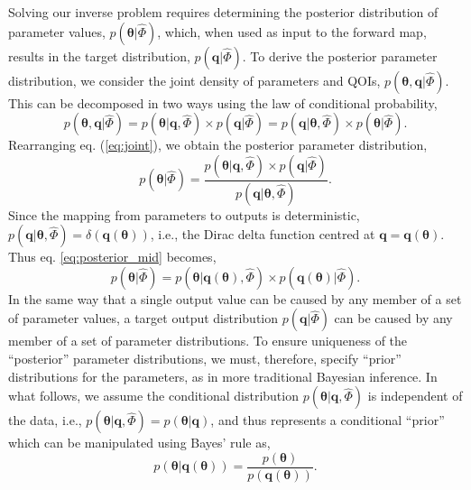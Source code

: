 Solving our inverse problem requires determining the posterior distribution of parameter values, $p(\boldsymbol{\theta}|\hat{\Phi})$, which, when used as input to the forward map, results in the target distribution, $p(\boldsymbol{q}|\hat{\Phi})$. To derive the posterior parameter distribution, we consider the joint density of parameters and QOIs, $p(\boldsymbol{\theta},\boldsymbol{q}|\hat{\Phi})$. This can be decomposed in two ways using the law of conditional probability,
%
\begin{equation}\label{eq:joint}
  p( \boldsymbol{\theta}, \boldsymbol{q}|\hat{\Phi})
= p( \boldsymbol{\theta}|\boldsymbol{q}, \hat{\Phi}) \times p(\boldsymbol{q}|\hat{\Phi})
= p( \boldsymbol{q}|\boldsymbol{\theta}, \hat{\Phi}) \times p(\boldsymbol{\theta}|\hat{\Phi}).
\end{equation}
%
Rearranging eq. (\ref{eq:joint}), we obtain the posterior parameter distribution,
%
\begin{equation}\label{eq:posterior_mid}
p(\boldsymbol{\theta}|\hat{\Phi})
= \frac{p(\boldsymbol{\theta}|\boldsymbol{q}, \hat{\Phi}) \times p(\boldsymbol{q}|\hat{\Phi})}{p(\boldsymbol{q}| \boldsymbol{\theta}, \hat{\Phi})}.
\end{equation}
%
Since the mapping from parameters to outputs is deterministic,
$p(\boldsymbol{q}| \boldsymbol{\theta}, \hat{\Phi})=\delta(\boldsymbol{q}(\boldsymbol{\theta}))$, i.e., the Dirac delta function centred at $\boldsymbol{q}=\boldsymbol{q}(\boldsymbol{\theta})$. Thus eq. \eqref{eq:posterior_mid} becomes,
%
\begin{equation}\label{eq:posterior_mid1}
p(\boldsymbol{\theta}|\hat{\Phi})
= p(\boldsymbol{\theta}|\boldsymbol{q}(\boldsymbol{\theta}), \hat{\Phi}) \times p(\boldsymbol{q}(\boldsymbol{\theta})|\hat{\Phi}).
\end{equation}
%
In the same way that a single output value can be caused by any member of a set of parameter values, a target output distribution $p(\boldsymbol{q}|\hat{\Phi})$ can be caused by any member of a set of parameter distributions. To ensure uniqueness of the ``posterior'' parameter distributions, we must, therefore, specify ``prior'' distributions for the parameters, as in more traditional Bayesian inference. In what follows, we assume the conditional distribution $p(\boldsymbol{\theta}|\boldsymbol{q}, \hat{\Phi})$ is independent of the data, i.e., $p(\boldsymbol{\theta}|\boldsymbol{q}, \hat{\Phi})=p(\boldsymbol{\theta}|\boldsymbol{q})$, and thus represents a conditional ``prior'' which can be manipulated using Bayes' rule as,
%
\begin{equation}\label{eq:prior}
p(\boldsymbol{\theta}|\boldsymbol{q}(\boldsymbol{\theta})) = \frac{p(\boldsymbol{\theta})}{p(\boldsymbol{q}(\boldsymbol{\theta}))}.
\end{equation}

